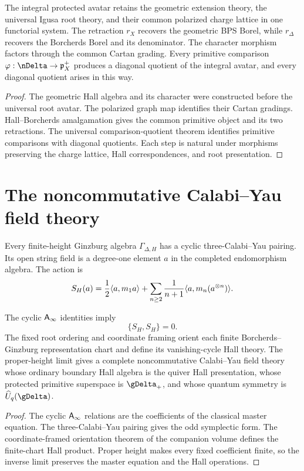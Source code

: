 \begin{theorem}
The integral protected avatar retains the geometric extension theory, the universal Igusa root theory, and their common polarized charge lattice in one functorial system.  The retraction $r_X$ recovers the geometric BPS Borel, while $r_\Delta$ recovers the Borcherds Borel and its denominator.  The character morphism factors through the common Cartan grading.  Every primitive comparison $\varphi:\nDelta\to\mathfrak p_X^+$ produces a diagonal quotient of the integral avatar, and every diagonal quotient arises in this way.
\end{theorem}
\begin{proof}
The geometric Hall algebra and its character were constructed before the universal root avatar.  The polarized graph map identifies their Cartan gradings.  Hall--Borcherds amalgamation gives the common primitive object and its two retractions.  The universal comparison-quotient theorem identifies primitive comparisons with diagonal quotients.  Each step is natural under morphisms preserving the charge lattice, Hall correspondences, and root presentation.
\end{proof}

\chapter{The noncommutative Calabi--Yau field theory}
Every finite-height Ginzburg algebra $\Gamma_{\Delta,H}$ has a cyclic three-Calabi--Yau pairing.  Its open string field is a degree-one element $a$ in the completed endomorphism algebra.  The action is
\[
 S_H(a)=
 \frac12\langle a,m_1a\rangle
 +\sum_{n\ge2}\frac1{n+1}\langle a,m_n(a^{\otimes n})\rangle.
\]

\begin{theorem}
The cyclic $\mathsf A_\infty$ identities imply
\[
 \{S_H,S_H\}=0.
\]
The fixed root ordering and coordinate framing orient each finite Borcherds--Ginzburg representation chart and define its vanishing-cycle Hall theory.  The proper-height limit gives a complete noncommutative Calabi--Yau field theory whose ordinary boundary Hall algebra is the quiver Hall presentation, whose protected primitive superspace is $\gDelta_+$, and whose quantum symmetry is $\widehat U_q(\gDelta)$.
\end{theorem}
\begin{proof}
The cyclic $\mathsf A_\infty$ relations are the coefficients of the classical master equation.  The three-Calabi--Yau pairing gives the odd symplectic form.  The coordinate-framed orientation theorem of the companion volume defines the finite-chart Hall product.  Proper height makes every fixed coefficient finite, so the inverse limit preserves the master equation and the Hall operations.
\end{proof}

